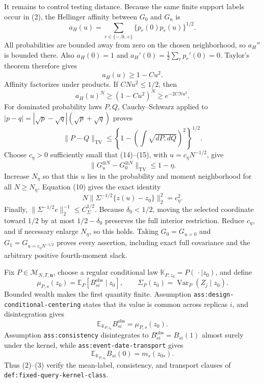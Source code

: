 It remains to control testing distance.  Because the same finite support labels occur in (2), the Hellinger affinity between \(G_0\) and \(G_u\) is
\[
 a_H(u)=\sum_{r\in\{-,0,+\}}\{p_r(0)p_r(u)\}^{1/2}.       \tag{12}
\]
All probabilities are bounded away from zero on the chosen neighborhood, so \(a_H''\) is bounded there.  Also
\(a_H(0)=1\) and
\(a_H'(0)=\tfrac12\sum_rp_r'(0)=0\).  Taylor's theorem therefore gives
\[
 a_H(u)\ge1-Cu^2.                                          \tag{13}
\]
Affinity factorizes under products.  If \(CNu^2\le1/2\), then
\[
 a_H(u)^N\ge(1-Cu^2)^N\ge e^{-2CNu^2}.                    \tag{14}
\]
For dominated probability laws \(P,Q\), Cauchy--Schwarz applied to
\(|p-q|=|\sqrt p-\sqrt q|(\sqrt p+\sqrt q)\) proves
\[
 \|P-Q\|_{\mathrm{TV}}
 \le\left\{1-\left(\int\sqrt{dP,dQ}\right)^2\right\}^{1/2}. \tag{15}
\]
Choose \(c_\eta>0\) sufficiently small that (14)--(15), with
\(u=c_\eta N^{-1/2}\), give
\[
 \|G_u^{\otimes N}-G_0^{\otimes N}\|_{\mathrm{TV}}
 \le1-\eta.                                                 \tag{16}
\]
Increase \(N_\eta\) so that this \(u\) lies in the probability and moment neighborhood for all \(N\ge N_\eta\).  Equation (10) gives the exact identity
\[
 N\|\Sigma^{-1/2}\{z(u)-z_0\}\|_2^2=c_\eta^2.           \tag{17}
\]
Finally,
\(\|\Sigma^{-1/2}e\|_2^{-1}\le C_\Sigma^{1/2}\).  Because \(\delta_0<1/2\), moving the selected coordinate toward \(1/2\) by at most \(1/2-\delta_0\) preserves the full interior restriction.  Reduce \(c_\eta\), and if necessary enlarge \(N_\eta\), so this holds.  Taking \(G_0=G_{u=0}\) and \(G_1=G_{u=c_\eta N^{-1/2}}\) proves every assertion, including exact full covariance and the arbitrary positive fourth-moment slack.

Fix \(P\in\mathcal M_{N,T,\mathbf n}\), choose a regular conditional law
\(\mathbb K_{P,z_0}=P(\,\cdot\mid z_0)\), and define
\[
 \mu_{P,s}(z_0)=\mathbb E_P[B_{si}^{\mathrm{obs}}\mid z_0],
 \qquad
 \Sigma_P(z_0)=\operatorname{Var}_P(Z_j\mid z_0).           \tag{1}
\]
Bounded wealth makes the first quantity finite.  Assumption
\texttt{ass:design-conditional-centering} states that its value is common across replicas \(i\), and disintegration gives
\[
 \mathbb E_{\mathbb K_{P,z_0}}B_{si}^{\mathrm{obs}}
 =\mu_{P,s}(z_0).                                           \tag{2}
\]
Assumption \texttt{ass:consistency} disintegrates to
\(B_{si}^{\mathrm{obs}}=B_{si}(1)\) almost surely under the kernel, while \texttt{ass:event-date-transport} gives
\[
 \mathbb E_{\mathbb K_{P,z_0}}B_{si}(0)=m_s(z_{0s}).       \tag{3}
\]
Thus (2)--(3) verify the mean-label, consistency, and transport clauses of \texttt{def:fixed-query-kernel-class}.

